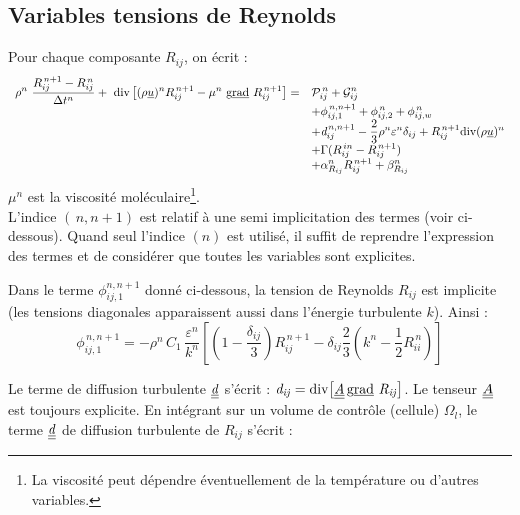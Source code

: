 \subsection{\bf Variables tensions de Reynolds}
Pour chaque composante $R_{ij}$, on \'ecrit :
\begin{equation}\label{Base_Turrij_Eq_Temp_Rij}
\begin{array}{ll}
\displaystyle
\rho^n\ \frac {R_{ij}^{\,n+1}-R_{ij}^{\,n}}{\Delta t^n}
+\ \text{div}\left[ (\rho \underline{u})^{n} R_{ij}^{\,n+1}
- \mu^n\ \text{g}\underline{\text{rad}}\ {R}_{ij}^{\,n+1} \right]
=  &
\displaystyle
\mathcal{P}^{\,n}_{ij}
+ \mathcal{G}^n_{ij} \\
&
\displaystyle
+ \phi^{\,n,n+1}_{ij,1} + \phi^{\,n}_{ij,2} + \phi^{\,n}_{ij,w} \\
&
\displaystyle
+ \text{\it{d}}^{\,n,n+1}_{ij}
- \displaystyle \frac{2}{3} \rho^n \varepsilon^n \delta_{ij}
+ R^{\,n+1}_{ij} \text{div}{(\rho \underline{u})^n} \\
&
\displaystyle
+ \Gamma(R^{\,in}_{ij} - R^{\,n+1}_{ij}) \\
&
\displaystyle
+ \alpha^n_{R_{ij}} R^{\,n+1}_{ij} + \beta^n_{R_{ij}}
\end{array}
\end{equation}
$\mu^n$ est la viscosit\'e mol\'eculaire\footnote{La viscosit\'e peut
d\'ependre \'eventuellement de la temp\'erature ou d'autres variables.}.\\
L'indice $(\,n,n+1)$ est relatif \`a une semi implicitation des termes (voir ci-dessous). Quand seul l'indice $(n)$ est utilis\'e, il suffit de reprendre l'expression des termes et de consid\'erer que toutes les variables sont explicites.

Dans le terme $\phi^{n,n+1}_{ij,1}$ donn\'e ci-dessous, la tension de Reynolds
 $R_{ij}$ est implicite (les tensions diagonales apparaissent aussi dans l'\'energie
turbulente $k$). Ainsi :
\begin{equation}
\displaystyle
\phi^{\,n,n+1}_{ij,1} = -\rho^n \,C_1\,\frac{\varepsilon^n}{k^n}\left[
(1-\frac{\delta_{ij}}{3}) R^{\,n+1}_{ij}- \delta_{ij} \frac{2}{3} (k^n-\frac{1}{2} R^{\,n}_{ii}) \right]
\end{equation}

Le terme de diffusion turbulente $\underline{\underline{\it{d}}}$ s'\'ecrit : $\it{d}_{ij} = \text{div}{\left[ \underline{\underline{A}}\,\text{g}\underline{\text{rad}}\ {R}_{ij} \right]}$.
Le tenseur $\underline{\underline{A}}$ est toujours explicite.
En int\'egrant sur un volume de contr\^ole (cellule) $\Omega_l$, le terme $\underline{\underline{\it{d}}}$ de diffusion turbulente de $R_{ij}$ s'\'ecrit :

